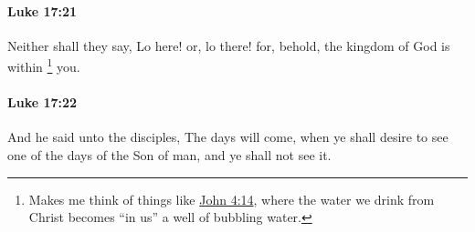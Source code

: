 		\paragraph{Luke 17:21} %
			\label{LUKE-17-21}

			Neither shall they say, Lo here! or, lo there! for, behold, the kingdom of God is within%
				\footnote{%
					Makes me think of things like \hyperref[JOHN-4-14]{John 4:14}, where the water we drink from Christ becomes ``in us'' a well of bubbling water.
					}
			you.

			\begin{framed}
			\scriptsize
				\begin{compactdesc}
					\item[SBLG] 
				\end{compactdesc}
			\end{framed}

		\paragraph{Luke 17:22} %
			\label{LUKE-17-22}

			And he said unto the disciples, The days will come, when ye shall desire to see one of the days of the Son of man, and ye shall not see it.

